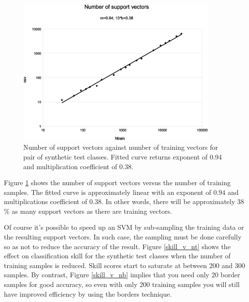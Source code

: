 \begin{figure}
\includegraphics[width=0.9\textwidth]{nsv}
\caption{Number of support vectors against number of training vectors for pair of synthetic test classes. Fitted curve returns exponent of 0.94 and multiplication coefficient of 0.38.}
\label{nsv}
\end{figure}

Figure \ref{nsv} shows the number of support vectors versus the
number of training samples. The fitted curve is approximately linear 
with an exponent of 0.94 and multiplications coefficient of 0.38.
In other words, there will be approximately 38 \% as many support vectors as 
there are training vectors.

Of course it's possible to speed up an SVM by sub-sampling the training data
or the resulting support vectors.
In such case, the sampling must be done carefully so as not to reduce the
accuracy of the result.
Figure \ref{skill_v_nt} shows the effect on classification skill for the
synthetic test classes when the number of training samples is reduced.
Skill scores start to saturate at between 200 and 300 samples.
By contrast, Figure \ref{skill_v_nb} implies that you need only 20 border samples
for good accuracy, so even with only 200 training samples you will still
have improved efficiency by using the borders technique.

